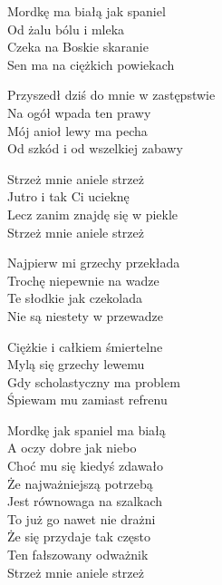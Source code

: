 \begin{text}
    Mordkę ma białą jak spaniel\\
    Od żalu bólu i mleka\\
    Czeka na Boskie skaranie\\
    Sen ma na ciężkich powiekach

    Przyszedł dziś do mnie w zastępstwie\\
    Na ogół wpada ten prawy\\
    Mój anioł lewy ma pecha\\
    Od szkód i od wszelkiej zabawy

    \vin Strzeż mnie aniele strzeż\\
    \vin Jutro i tak Ci ucieknę\\
    \vin Lecz zanim znajdę się w piekle\\
    \vin Strzeż mnie aniele strzeż

    Najpierw mi grzechy przekłada\\
    Trochę niepewnie na wadze\\
    Te słodkie jak czekolada\\
    Nie są niestety w przewadze

    Ciężkie i całkiem śmiertelne\\
    Mylą się grzechy lewemu\\
    Gdy scholastyczny ma problem\\
    Śpiewam mu zamiast refrenu

    Mordkę jak spaniel ma białą\\
    A oczy dobre jak niebo\\
    Choć mu się kiedyś zdawało\\
    Że najważniejszą potrzebą\\
    Jest równowaga na szalkach\\

    To już go nawet nie drażni\\
    Że się przydaje tak często\\
    Ten fałszowany odważnik\\
    Strzeż mnie aniele strzeż
\end{text}
\begin{chord}

\end{chord}